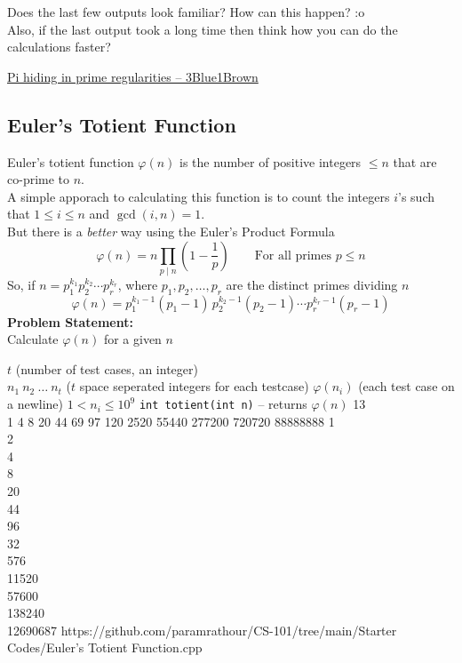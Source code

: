 \begin{noteI}
Does the last few outputs look familiar? How can this happen? :o\\
Also, if the last output took a long time then think how you can do the calculations faster?
\end{noteI}
\begin{funvideo}
\href{https://youtu.be/NaL_Cb42WyY}{Pi hiding in prime regularities -- 3Blue1Brown}
\end{funvideo}
\subsection{Euler's Totient Function}\label{pp:eulertotient}
Euler's totient function $\varphi(n)$ is the number of positive integers $\leq n$ that are co-prime to $n$.\\
A simple apporach to calculating this function is to count the integers $i$'s such that $1\leq i\leq n$ and $\gcd(i,n) = 1$.\\
But there is a \emph{better} way using the Euler's Product Formula
\begin{equation}
	\varphi (n)=n\prod _{p\mid n}\left(1-{\frac {1}{p}}\right)\qquad\text{For all primes $p\leq n$}
\end{equation}
So, if  ${\displaystyle n=p_{1}^{k_{1}}p_{2}^{k_{2}}\cdots p_{r}^{k_{r}}}$, where ${\displaystyle p_{1},p_{2},\ldots ,p_{r}}$ are the distinct primes dividing $n$
\begin{equation}
	{\displaystyle \varphi (n)=p_{1}^{k_{1}-1}(p_{1}{-}1)\,p_{2}^{k_{2}-1}(p_{2}{-}1)\cdots p_{r}^{k_{r}-1}(p_{r}{-}1)}
\end{equation}
\textbf{Problem Statement:}\\
Calculate $\varphi(n)$ for a given $n$

\begin{testcasesFunction}
	{$t$ \hfill(number of test cases, an integer)\\
	$n_1\ n_2\ \ldots\ n_t$ \hfill($t$ space seperated integers for each testcase)}
	{$\varphi(n_i)$ \hfill(each test case on a newline)}
	{$1 < n_i \leq 10^{9}$}
	{\texttt{int totient(int n)} -- returns $\varphi(n)$}
	{13\\1 4 8 20 44 69 97 120 2520 55440 277200 720720 88888888}
	{1\\2\\4\\8\\20\\44\\96\\32\\576\\11520\\57600\\138240\\12690687}
	{https://github.com/paramrathour/CS-101/tree/main/Starter Codes/Euler's Totient Function.cpp}
\end{testcasesFunction}
